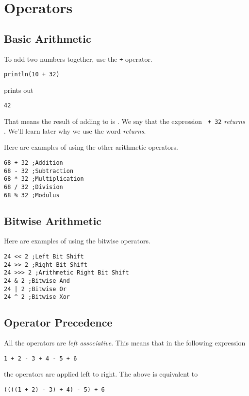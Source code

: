 \documentclass[10pt,oneside]{book}
\begin{document}
\section{Operators}
\subsection*{Basic Arithmetic}
To add two numbers together, use the \texttt{\frenchspacing +} operator. 
\begin{lstlisting}
println(10 + 32)
\end{lstlisting}
prints out
\begin{lstlisting}
42
\end{lstlisting}

That means the result of adding \texttt{} to \texttt{} is \texttt{}. We say that the expression \texttt{ + 32} {\em returns} \texttt{}. We'll learn later why we use the word {\em returns}. 

Here are examples of using the other arithmetic operators.
\begin{lstlisting}
68 + 32 ;Addition
68 - 32 ;Subtraction
68 * 32 ;Multiplication
68 / 32 ;Division
68 % 32 ;Modulus
\end{lstlisting}

\subsection*{Bitwise Arithmetic}

Here are examples of using the bitwise operators.
\begin{lstlisting}
24 << 2 ;Left Bit Shift
24 >> 2 ;Right Bit Shift
24 >>> 2 ;Arithmetic Right Bit Shift
24 & 2 ;Bitwise And
24 | 2 ;Bitwise Or
24 ^ 2 ;Bitwise Xor
\end{lstlisting}

\subsection*{Operator Precedence}

All the operators are {\em left associative}. This means that in the following expression
\begin{lstlisting}
1 + 2 - 3 + 4 - 5 + 6
\end{lstlisting}
the operators are applied left to right. The above is equivalent to
\begin{lstlisting}
((((1 + 2) - 3) + 4) - 5) + 6
\end{lstlisting}
\end{document}
